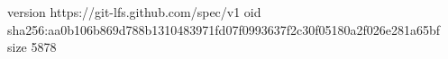 version https://git-lfs.github.com/spec/v1
oid sha256:aa0b106b869d788b1310483971fd07f0993637f2c30f05180a2f026e281a65bf
size 5878
